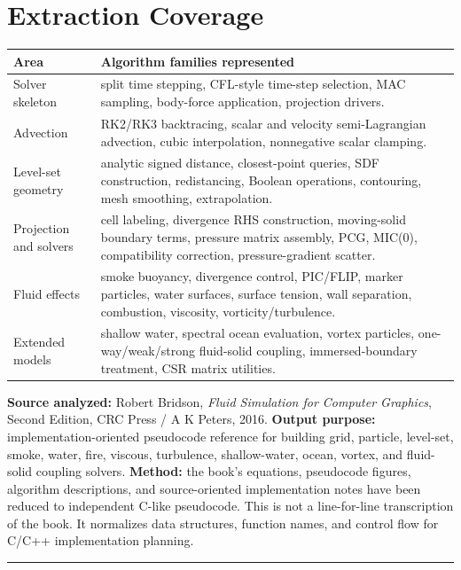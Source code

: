 \documentclass[10pt,letterpaper]{article}
\begin{document}
\section*{Extraction Coverage}
\begin{longtable}{>{\raggedright\arraybackslash}p{}>{\raggedright\arraybackslash}p{}}
\toprule
\textbf{Area} & \textbf{Algorithm families represented}\\
\midrule
Solver skeleton & split time stepping, CFL-style time-step selection, MAC sampling, body-force application, projection drivers.\\
Advection & RK2/RK3 backtracing, scalar and velocity semi-Lagrangian advection, cubic interpolation, nonnegative scalar clamping.\\
Level-set geometry & analytic signed distance, closest-point queries, SDF construction, redistancing, Boolean operations, contouring, mesh smoothing, extrapolation.\\
Projection and solvers & cell labeling, divergence RHS construction, moving-solid boundary terms, pressure matrix assembly, PCG, MIC(0), compatibility correction, pressure-gradient scatter.\\
Fluid effects & smoke buoyancy, divergence control, PIC/FLIP, marker particles, water surfaces, surface tension, wall separation, combustion, viscosity, vorticity/turbulence.\\
Extended models & shallow water, spectral ocean evaluation, vortex particles, one-way/weak/strong fluid-solid coupling, immersed-boundary treatment, CSR matrix utilities.\\
\bottomrule
\end{longtable}

\textbf{Source analyzed:} Robert Bridson, \emph{Fluid Simulation for Computer Graphics}, Second Edition, CRC Press / A K Peters, 2016. \textbf{Output purpose:} implementation-oriented pseudocode reference for building grid, particle, level-set, smoke, water, fire, viscous, turbulence, shallow-water, ocean, vortex, and fluid-solid coupling solvers. \textbf{Method:} the book's equations, pseudocode figures, algorithm descriptions, and source-oriented implementation notes have been reduced to independent C-like pseudocode. This is not a line-for-line transcription of the book. It normalizes data structures, function names, and control flow for C/C++ implementation planning.

\medskip\hrule\medskip
\end{document}
